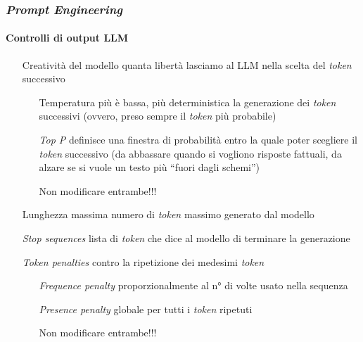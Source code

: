 %
\begin{frame}[t] \frametitle{\emph{Prompt Engineering}}
\framesubtitle{Controlli di output LLM}
{\footnotesize
    \begin{minipage}[t]{\textwidth}
        \begin{itemize}[leftmargin=80pt,align=right]
            \item[\alert{Creatività del modello}] quanta libertà lasciamo al LLM nella scelta del \emph{token} successivo
            \begin{itemize}[leftmargin=50pt,align=right]
            \item[\alert{Temperatura}] più è bassa, più deterministica la generazione dei \emph{token} successivi (ovvero, preso sempre il \emph{token} più probabile)
            \item[\alert{\emph{Top P}}] definisce una finestra di probabilità entro la quale poter scegliere il \emph{token} successivo (da abbassare quando si vogliono risposte fattuali, da alzare se si vuole un testo più ``fuori dagli schemi'')
            \item[\alert{\faExclamationTriangle}] Non modificare entrambe!!!
            \end{itemize}
            \item[\alert{Lunghezza massima}] numero di \emph{token} massimo generato dal modello
            \item[\alert{\emph{Stop sequences}}] lista di \emph{token} che dice al modello di terminare la generazione
            \item[\alert{\emph{Token penalties}}] contro la ripetizione dei medesimi \emph{token}
            \begin{itemize}[leftmargin=63pt,align=right]
                \item[\alert{\emph{Frequence penalty}}] proporzionalmente al n° di volte usato nella sequenza
                \item[\alert{\emph{Presence penalty}}] globale per tutti i \emph{token} ripetuti
                \item[\alert{\faExclamationTriangle}] Non modificare entrambe!!!
            \end{itemize}
        \end{itemize}
    \end{minipage}
}
\end{frame}
%
